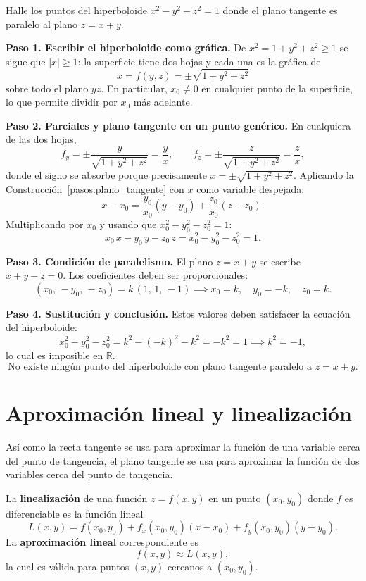 \begin{prob}
Halle los puntos del hiperboloide $x^2-y^2-z^2=1$ donde el plano tangente es paralelo al plano $z = x + y.$
\begin{myproof}
\textbf{Paso 1. Escribir el hiperboloide como gráfica.}
De $x^2=1+y^2+z^2\ge 1$ se sigue que $|x|\ge 1$: la superficie tiene dos hojas y cada una es la gráfica de
\[
x=f(y,z)=\pm\sqrt{1+y^2+z^2}
\]
sobre todo el plano $yz$. En particular, $x_0\neq 0$ en cualquier punto de la superficie, lo que permite dividir por $x_0$ más adelante.

\textbf{Paso 2. Parciales y plano tangente en un punto genérico.}
En cualquiera de las dos hojas,
\[
f_y=\pm\frac{y}{\sqrt{1+y^2+z^2}}=\frac{y}{x},
\qquad
f_z=\pm\frac{z}{\sqrt{1+y^2+z^2}}=\frac{z}{x},
\]
donde el signo se absorbe porque precisamente $x=\pm\sqrt{1+y^2+z^2}$. Aplicando la Construcción~\ref{pasos:plano_tangente} con $x$ como variable despejada:
\[
x-x_0=\frac{y_0}{x_0}(y-y_0)+\frac{z_0}{x_0}(z-z_0).
\]
Multiplicando por $x_0$ y usando que $x_0^2-y_0^2-z_0^2=1$:
\[
x_0\,x-y_0\,y-z_0\,z=x_0^2-y_0^2-z_0^2=1.
\]

\textbf{Paso 3. Condición de paralelismo.}
El plano $z=x+y$ se escribe $x+y-z=0$. Los coeficientes deben ser proporcionales:
\[
(x_0,\,-y_0,\,-z_0)=k\,(1,\,1,\,-1)
\implies
x_0=k,\quad y_0=-k,\quad z_0=k.
\]

\textbf{Paso 4. Sustitución y conclusión.}
Estos valores deben satisfacer la ecuación del hiperboloide:
\[
x_0^2-y_0^2-z_0^2=k^2-(-k)^2-k^2=-k^2=1\implies k^2=-1,
\]
lo cual es imposible en $\mathbb{R}$.
\[
\boxed{\text{No existe ningún punto del hiperboloide con plano tangente paralelo a }z=x+y.}
\]
\end{myproof}
\end{prob}

\section{Aproximación lineal y linealización}

Así como la recta tangente se usa para aproximar la función de una variable cerca del punto de tangencia, el plano tangente se usa para aproximar la función de dos variables cerca del punto de tangencia.

\begin{definition}[Linealización]
La \textbf{linealización} de una función $z = f(x, y)$ en un punto $(x_0, y_0)$ donde $f$ es diferenciable es la función lineal
\[
L(x, y) = f(x_0, y_0) + f_x(x_0, y_0)(x - x_0) + f_y(x_0, y_0)(y - y_0).
\]
La \textbf{aproximación lineal} correspondiente es
\[
f(x, y) \approx L(x, y),
\]
la cual es válida para puntos $(x, y)$ cercanos a $(x_0, y_0)$.
\end{definition}

